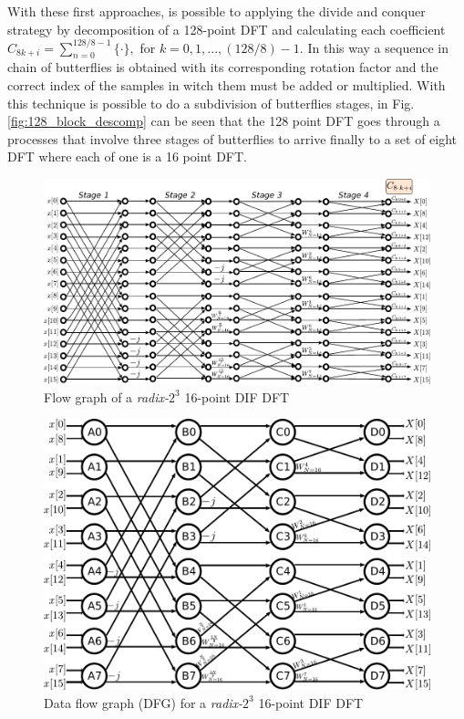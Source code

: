\documentclass[journal,comsoc]{IEEEtran}
\begin{document}
With these first approaches, is possible to applying the divide and conquer strategy by decomposition of a 128-point DFT and calculating each coefficient $C_{8k+i} = \sum_{n=0}^{128/8-1} \{ \cdot \}, $ for $k=0,1,...,(128/8)-1$. In this way a sequence in chain of butterflies is obtained with its corresponding rotation factor and the correct index of the samples in witch them must be added or multiplied. With this technique is possible to do a subdivision of butterflies stages, in Fig. \ref{fig:128_block_descomp} can be seen that the 128 point DFT goes through a processes that involve three stages of butterflies to arrive finally to a set of eight DFT where each of one is a 16 point DFT.

\begin{figure}
	\centering
	\includegraphics[width=\linewidth]{Diagramas/miSeccionFiguras/16PuntosRadix8Conexion.pdf}
	\caption{Flow graph of a \textit{radix-}$2^3$ 16-point DIF DFT}
	\label{fig:16points_df}
\end{figure}


\begin{figure}
	\centering
	\includegraphics[width=\linewidth]{Diagramas/miSeccionFiguras/16PuntosRadix8Burbujas.pdf}
	\caption{Data flow graph (DFG) for a \textit{radix-}$2^3$ 16-point DIF DFT}
	\label{fig:16points_dfg}
\end{figure}
\end{document}
